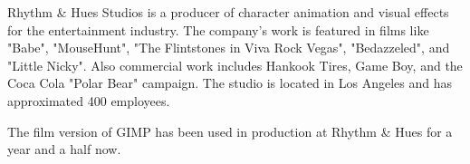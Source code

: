 Rhythm \& Hues Studios is a producer of character animation and visual effects
for the entertainment industry. The company's work is featured in films like
"Babe", "MouseHunt", "The Flintstones in Viva Rock Vegas", "Bedazzeled", and
"Little Nicky". Also commercial work includes Hankook Tires, Game Boy, and the
Coca Cola "Polar Bear" campaign. The studio is located in Los Angeles and has
approximated 400 employees.

The film version of GIMP has been used in production at Rhythm \& Hues for
a year and a half now.
